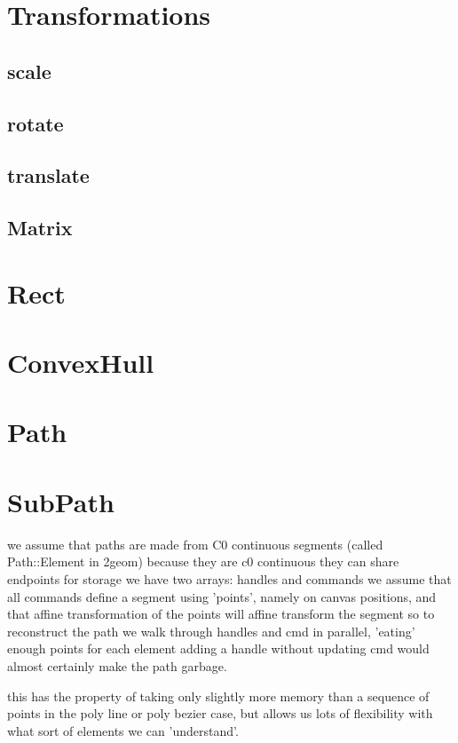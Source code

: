 \section{Transformations}
\subsection{scale}
\subsection{rotate}
\subsection{translate}
\subsection{Matrix}

\section{Rect}

\section{ConvexHull}

\section{Path}



\section{SubPath}


we assume that paths are made from C0 continuous segments
(called Path::Element in 2geom)
because they are c0 continuous they can share endpoints
for storage we have two arrays: handles and commands
we assume that all commands define a segment using 'points', namely on canvas positions, and that affine transformation of the points will affine transform the segment
so to reconstruct the path we walk through handles and cmd in parallel, 'eating' enough points for each element
adding a handle without updating cmd would almost certainly make the path garbage.

this has the property of taking only slightly more memory than a sequence of points in the poly line or poly bezier case, but allows us lots of flexibility with what sort of elements we can 'understand'.

